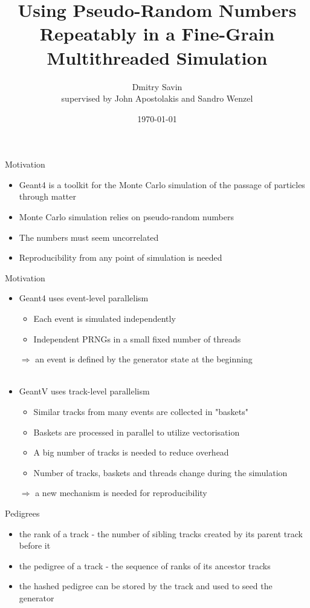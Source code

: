 \documentclass[aspectratio=169, 14pt]{beamer}
\title{Using Pseudo-Random Numbers Repeatably in a Fine-Grain Multithreaded Simulation}
\author{Dmitry Savin\\
supervised by John Apostolakis and Sandro Wenzel}
\date{\today}
\begin{document}
\begin{large}

 \frame{\titlepage}


 \begin{frame}{Motivation}
 \large
  \begin{itemize}
   \item Geant4 is a toolkit for the Monte Carlo simulation of the passage of particles through matter
   \item Monte Carlo simulation relies on pseudo-random numbers
   \item The numbers must seem uncorrelated
   \item Reproducibility from any point of simulation is needed
  \end{itemize}
 \end{frame}
 
  \begin{frame}{Motivation}
  \large
  \begin{itemize}
   \item Geant4 uses event-level parallelism
   \begin{itemize}
     \item Each event is simulated independently
     \item Independent PRNGs in a small fixed number of threads
    \end{itemize}
    $\Rightarrow$ an event is defined by the generator state at the beginning\\ \ \\
   \item GeantV uses track-level parallelism
    \begin{itemize}
     \item Similar tracks from many events are collected in "baskets"
     \item Baskets are processed in parallel to utilize vectorisation
     \item A big number of tracks is needed to reduce overhead
     \item Number of tracks, baskets and threads change during the simulation
    \end{itemize}
   $\Rightarrow$ a new mechanism is needed for reproducibility
  \end{itemize}

 \end{frame}

 
 \begin{frame}{Pedigrees}
  \begin{itemize}
   \item the rank of a track - the number of sibling tracks created by its parent track before it
   \item the pedigree of a track - the sequence of ranks of its ancestor tracks
   \item the hashed pedigree can be stored by the track and used to seed the generator
  \end{itemize}
 \end{frame}



\end{large}
\end{document}
